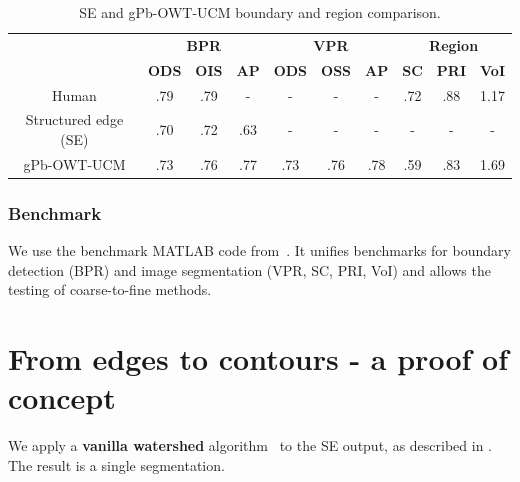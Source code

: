 \begin{table}[htbp]
\renewcommand{\arraystretch}{1.3}
\centering
\scriptsize
\begin{tabular}{l|c|c|c||c|c|c||c|c|c|}
\cline{2-10} %
\multirow{2}{*}{} & \multicolumn{3}{c||}{\textbf{BPR}} & \multicolumn{3}{c||}{\textbf{VPR}}& \multicolumn{3}{c|}{\textbf{Region}}\\
\cline{2-10}
& \textbf{ODS}  & \textbf{OIS} & \textbf{AP} %
& \textbf{ODS} & \textbf{OSS} & \textbf{AP} %
& \textbf{SC} & \textbf{PRI} & \textbf{VoI} \\
\hline
\multicolumn{1}{|c|}{Human} & .79 & .79 & - & - & - & - & .72 & .88 & 1.17 \\ %
\hline
\hline
\multicolumn{1}{|c|}{\cite{DollarICCV13edges} Structured edge (SE)} & .70 & .72 & .63 & - & - & - & - & - & - \\
\hline
\multicolumn{1}{|c|}{\cite{Arbelaez11} gPb-OWT-UCM} & .73 & .76 & .77 & .73 & .76 & .78 & .59 & .83 & 1.69 \\
\hline
\end{tabular}
\caption[SE and gPb-OWT-UCM boundary and region comparison]{SE and gPb-OWT-UCM boundary and region comparison.}
\label{tab:SE_vs_gPb_OWT_UCM}
\end{table}

\subsubsection{Benchmark}
We use the benchmark MATLAB code from~\cite{Galasso13Benchmark}. %
It unifies benchmarks for boundary detection (BPR) and image segmentation (VPR, SC, %
PRI, VoI) and allows the testing of coarse-to-fine methods. %

\section{From edges to contours - a proof of concept}
We apply a {\bf vanilla watershed} algorithm~\cite{beucher1992morphological,najman1996geodesic,PINKlibrary} to the SE output, as described in . The result is a single segmentation. 

